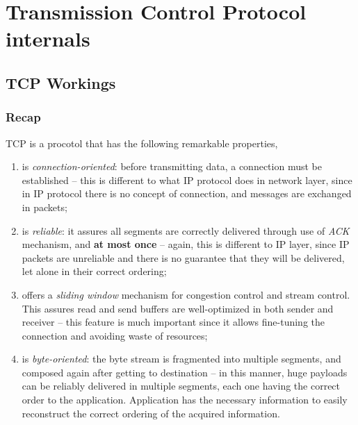 \documentclass[10pt]{book}
\begin{document}
\setmonofont[Scale=.85]{Fira Code Retina}



\setlength{\headsep}{30pt}
\setlength{\footskip}{40pt}
\setlength{\marginparsep}{20pt}
\setlength{\marginparwidth}{60pt}
\tableofcontents

\part{Transmission Control Protocol internals}

\chapter{TCP Workings}

\section{Recap}
TCP is a procotol that has the following remarkable properties,

\begin{enumerate}
	\item is \emph{connection-oriented}: before transmitting data, a
		connection must be established \--- this is different to what
		IP protocol does in network layer, since in IP protocol there
		is no concept of connection, and messages are exchanged in
		packets;
	\item is \emph{reliable}: it assures all segments are correctly
		delivered through use of \emph{ACK} mechanism, and \textbf{at
		most once} \--- again, this is different to IP layer, since IP
		packets are unreliable and there is no guarantee that they will
		be delivered, let alone in their correct ordering;
	\item offers a \emph{sliding window} mechanism for congestion control
		and stream control. This assures read and send buffers are
		well-optimized in both sender and receiver \--- this feature is
		much important since it allows fine-tuning the connection and
		avoiding waste of resources;
	\item is \emph{byte-oriented}: the byte stream is fragmented into
		multiple segments, and composed again after getting to
		destination \--- in this manner, huge payloads can be reliably
		delivered in multiple segments, each one having the correct
		order to the application. Application has the necessary information
		to easily reconstruct the correct ordering of the acquired 
		information.
\end{enumerate}
\end{document}

